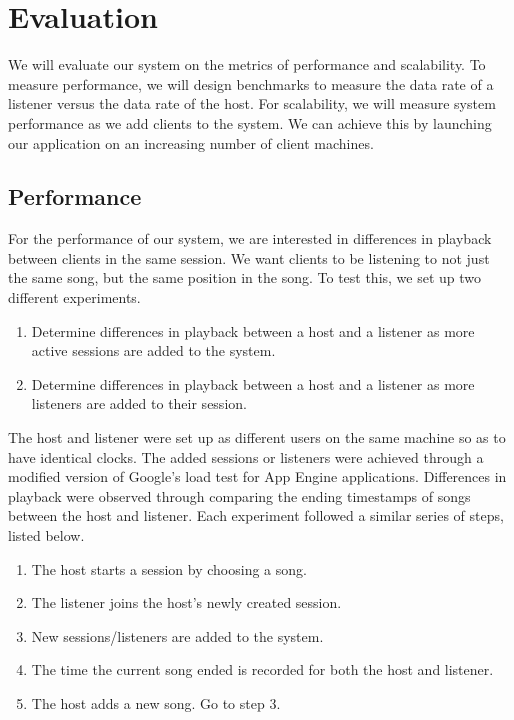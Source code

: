 \section{Evaluation}
\label{sec:eval}
We will evaluate our system on the metrics of performance
and scalability. To measure performance, 
we will design benchmarks to measure the data rate 
of a listener versus the data rate of the host.
For scalability, we will measure system 
performance as we add clients to the system. We can 
achieve this by launching our application on an 
increasing number of client machines.

\subsection{Performance}

For the performance of our system, we are interested in
differences in playback between clients in the same session.
We want clients to be listening to not just the same song,
but the same position in the song. To test this, we set up two
different experiments.

\begin{enumerate}

\item Determine differences in playback between a host and a
listener as more active sessions are added to the system.

\item Determine differences in playback between a host and a
listener as more listeners are added to their session.

\end{enumerate}

The host and listener were set up as different users on the same machine
so as to have identical clocks. The added sessions or listeners
were achieved through a modified version of Google's load test
for App Engine applications. Differences in playback were observed
through comparing the ending timestamps of songs between the host
and listener. Each experiment followed a similar series of steps,
listed below.

\begin{enumerate}

\item The host starts a session by choosing a song.

\item The listener joins the host's newly created session.

\item New sessions/listeners are added to the system.

\item The time the current song ended is recorded for both the
host and listener.

\item The host adds a new song. Go to step 3.

\end{enumerate}


